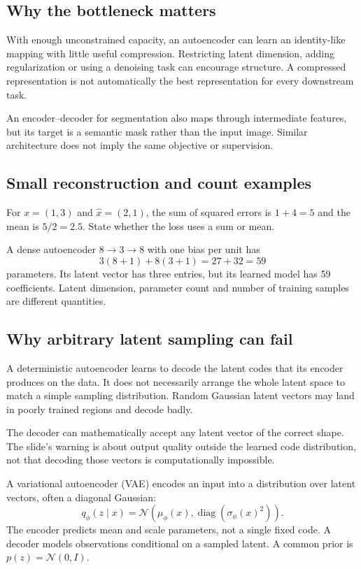 \documentclass[11pt]{article}
\begin{document}
\subsection{Why the bottleneck matters}
With enough unconstrained capacity, an autoencoder can learn an identity-like mapping with little useful compression. Restricting latent dimension, adding regularization or using a denoising task can encourage structure. A compressed representation is not automatically the best representation for every downstream task.

An encoder--decoder for segmentation also maps through intermediate features, but its target is a semantic mask rather than the input image. Similar architecture does not imply the same objective or supervision.

\subsection{Small reconstruction and count examples}
For $x=(1,3)$ and $\widehat{x}=(2,1)$, the sum of squared errors is $1+4=5$ and the mean is $5/2=2.5$. State whether the loss uses a sum or mean.

A dense autoencoder $8\to3\to8$ with one bias per unit has
\[
3(8+1)+8(3+1)=27+32=59
\]
parameters. Its latent vector has three entries, but its learned model has 59 coefficients. Latent dimension, parameter count and number of training samples are different quantities.

\subsection{Why arbitrary latent sampling can fail}
A deterministic autoencoder learns to decode the latent codes that its encoder produces on the data. It does not necessarily arrange the whole latent space to match a simple sampling distribution. Random Gaussian latent vectors may land in poorly trained regions and decode badly.

The decoder can mathematically accept any latent vector of the correct shape. The slide's warning is about output quality outside the learned code distribution, not that decoding those vectors is computationally impossible.

A variational autoencoder (VAE) encodes an input into a distribution over latent vectors, often a diagonal Gaussian:
\[
q_\phi(z\mid x)=\mathcal N\!\left(\mu_\phi(x),
\operatorname{diag}(\sigma_\phi(x)^2)\right).
\]
The encoder predicts mean and scale parameters, not a single fixed code. A decoder models observations conditional on a sampled latent. A common prior is $p(z)=\mathcal N(0,I)$.
\end{document}
